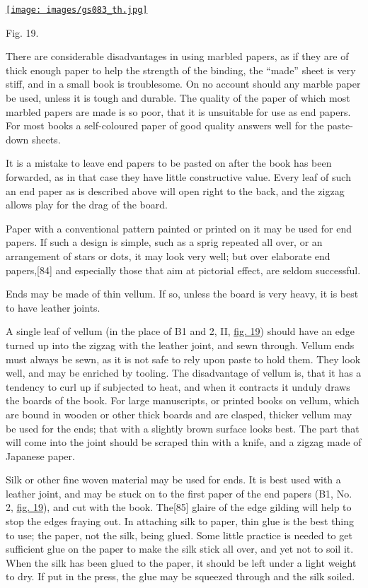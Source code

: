 \documentclass[
]{article}
\begin{document}
\href{images/gs083.jpg}{\texttt{[image: images/gs083\_th.jpg]}}\protect\hypertarget{Fig_19}{}{}

{Fig.} 19.

There are considerable disadvantages in using marbled papers, as if they
are of thick enough paper to help the strength of the binding, the
``made'' sheet is very stiff, and in a small book is troublesome. On no
account should any marble paper be used, unless it is tough and durable.
The quality of the paper of which most marbled papers are made is so
poor, that it is unsuitable for use as end papers. For most books a
self-coloured paper of good quality answers well for the paste-down
sheets.

It is a mistake to leave end papers to be pasted on after the book has
been forwarded, as in that case they have little constructive value.
Every leaf of such an end paper as is described above will open right to
the back, and the zigzag allows play for the drag of the board.

Paper with a conventional pattern painted or printed on it may be used
for end papers. If such a design is simple, such as a sprig repeated all
over, or an arrangement of stars or dots, it may look very well; but
over elaborate end papers,{\protect\hypertarget{Page_84}{}{{[}84{]}}}
and especially those that aim at pictorial effect, are seldom
successful.

Ends may be made of thin vellum. If so, unless the board is very heavy,
it is best to have leather joints.

A single leaf of vellum (in the place of B1 and 2, II,
\protect\hyperlink{Fig_19}{fig. 19}) should have an edge turned up into
the zigzag with the leather joint, and sewn through. Vellum ends must
always be sewn, as it is not safe to rely upon paste to hold them. They
look well, and may be enriched by tooling. The disadvantage of vellum
is, that it has a tendency to curl up if subjected to heat, and when it
contracts it unduly draws the boards of the book. For large manuscripts,
or printed books on vellum, which are bound in wooden or other thick
boards and are clasped, thicker vellum may be used for the ends; that
with a slightly brown surface looks best. The part that will come into
the joint should be scraped thin with a knife, and a zigzag made of
Japanese paper.

Silk or other fine woven material may be used for ends. It is best used
with a leather joint, and may be stuck on to the first paper of the end
papers (B1, No. 2, \protect\hyperlink{Fig_19}{fig. 19}), and cut with
the book. The{\protect\hypertarget{Page_85}{}{{[}85{]}}} glaire of the
edge gilding will help to stop the edges fraying out. In attaching silk
to paper, thin glue is the best thing to use; the paper, not the silk,
being glued. Some little practice is needed to get sufficient glue on
the paper to make the silk stick all over, and yet not to soil it. When
the silk has been glued to the paper, it should be left under a light
weight to dry. If put in the press, the glue may be squeezed through and
the silk soiled.
\end{document}
